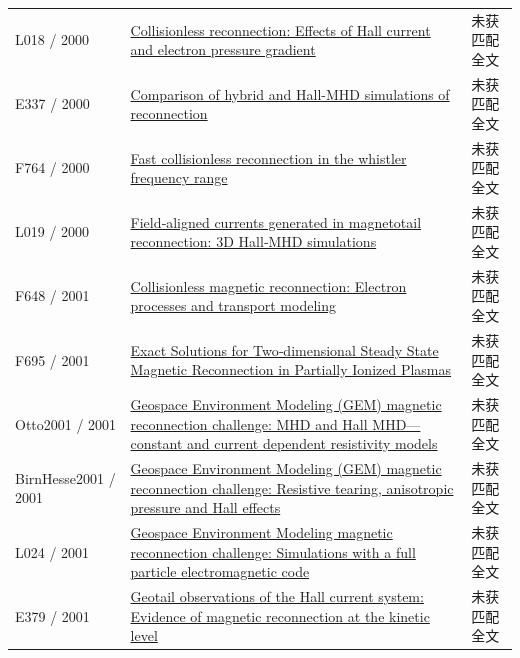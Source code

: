 \documentclass[UTF8,a4paper,11pt,openany,fontset=fandol]{ctexbook}
\begin{document}
\begin{longtable}{P{24mm}P{97mm}P{27mm}}
L018 / 2000 & \href{https://doi.org/10.1029/1999ja000357}{Collisionless reconnection: Effects of Hall current and electron pressure gradient} & 未获匹配全文\\

E337 / 2000 & \href{http://ui.adsabs.harvard.edu/abs/2000APS..DPPNP1059Y/abstract}{Comparison of hybrid and Hall-MHD simulations of reconnection} & 未获匹配全文\\

F764 / 2000 & \href{https://doi.org/10.1063/1.874076}{Fast collisionless reconnection in the whistler frequency range} & 未获匹配全文\\

L019 / 2000 & \href{https://doi.org/10.1029/1999gl003688}{Field‐aligned currents generated in magnetotail reconnection: 3D Hall‐MHD simulations} & 未获匹配全文\\

F648 / 2001 & \href{https://doi.org/10.1029/1999ja001002}{Collisionless magnetic reconnection: Electron processes and transport modeling} & 未获匹配全文\\

F695 / 2001 & \href{https://doi.org/10.1086/319012}{Exact Solutions for Two‐dimensional Steady State Magnetic Reconnection in Partially Ionized Plasmas} & 未获匹配全文\\

Otto2001 / 2001 & \href{https://doi.org/10.1029/1999ja001005}{Geospace Environment Modeling (GEM) magnetic reconnection challenge: MHD and Hall MHD—constant and current dependent resistivity models} & 未获匹配全文\\

BirnHesse2001 / 2001 & \href{https://doi.org/10.1029/1999ja001001}{Geospace Environment Modeling (GEM) magnetic reconnection challenge: Resistive tearing,  anisotropic pressure and Hall effects} & 未获匹配全文\\

L024 / 2001 & \href{https://doi.org/10.1029/1999ja001006}{Geospace Environment Modeling magnetic reconnection challenge: Simulations with a full particle electromagnetic code} & 未获匹配全文\\

E379 / 2001 & \href{http://t2r2.star.titech.ac.jp/cgi-bin/publicationinfo.cgi?q_publication_content_number=CTT100469369}{Geotail observations of the Hall current system: Evidence of magnetic reconnection at the kinetic level} & 未获匹配全文\\


\end{longtable}
\end{document}
